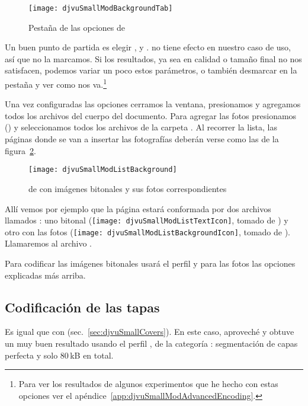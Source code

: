 \documentclass[%
	a5paper,
	10pt,
	twoside,
	openright,
	final,
]{memoir}
\begin{document}
	\begin{figure}
		\texttt{[image: djvuSmallModBackgroundTab]}
		\caption{Pestaña  de las opciones de \djvusmallmod\label{fig:djvuSmallModBackgroundTab}}
	\end{figure}

	Un buen punto de partida es elegir ,  y .  no tiene efecto en nuestro caso de uso, así que no la marcamos. Si los resultados, ya sea en calidad o tamaño final no nos satisfacen, podemos variar un poco estos parámetros, o también desmarcar  en la pestaña  y ver como nos va.\footnote{Para ver los resultados de algunos experimentos que he hecho con estas opciones ver el apéndice~\ref{app:djvuSmallModAdvancedEncoding}.}

	Una vez configuradas las opciones cerramos la ventana, presionamos  y agregamos todos los archivos del cuerpo del documento. Para agregar las fotos presionamos \keys{{+}} () y seleccionamos todos los archivos de la carpeta . Al recorrer la lista, las páginas donde se van a insertar las fotografías deberán verse como las de la figura~\ref{fig:djvuSmallModListBackground}.

	\begin{figure}
		\texttt{[image: djvuSmallModListBackground]}
		\caption[ de \djvusmallmod con bitonales y fotos]{ de \djvusmallmod con imágenes bitonales y sus fotos correspondientes\label{fig:djvuSmallModListBackground}}
	\end{figure}

	Allí vemos por ejemplo que la página \menu{[0014]} estará conformada por dos archivos llamados : uno bitonal  (\texttt{[image: djvuSmallModListTextIcon]}, tomado de ) y otro con las fotos (\texttt{[image: djvuSmallModListBackgroundIcon]}, tomado de ). Llamaremos al archivo .

	Para codificar las imágenes bitonales \djvusmallmod usará el perfil  y para las fotos las opciones explicadas más arriba.

	\subsection{Codificación de las tapas} Es igual que con \djvusmall (sec.~\ref{sec:djvuSmallCovers}). En este caso, aproveché y obtuve un muy buen resultado usando el perfil , de la categoría : segmentación de capas perfecta y solo 80\,kB en total.
\end{document}
